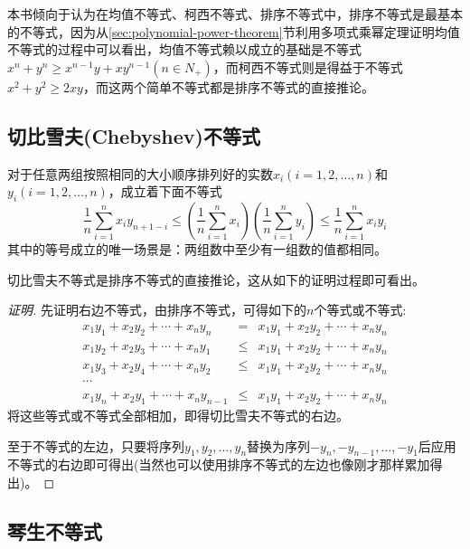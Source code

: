 本书倾向于认为在均值不等式、柯西不等式、排序不等式中，排序不等式是最基本的不等式，因为从\ref{sec:polynomial-power-theorem}节利用多项式乘幂定理证明均值不等式的过程中可以看出，均值不等式赖以成立的基础是不等式$x^n+y^n \geqslant x^{n-1}y+xy^{n-1}(n \in N_+)$，而柯西不等式则是得益于不等式$x^2+y^2 \geqslant 2xy$，而这两个简单不等式都是排序不等式的直接推论。

\subsection{切比雪夫(Chebyshev)不等式}

\begin{theorem}[切比雪夫不等式]
对于任意两组按照相同的大小顺序排列好的实数$x_i(i=1,2,\ldots,n)$和$y_i(i=1,2,\ldots,n)$，成立着下面不等式
\begin{equation}
  \label{eq:chebyshev-inequation}
  \frac{1}{n}\sum_{i=1}^nx_iy_{n+1-i}
  \leqslant \left( \frac{1}{n}\sum_{i=1}^nx_i \right) \left( \frac{1}{n}\sum_{i=1}^ny_i \right)
  \leqslant \frac{1}{n}\sum_{i=1}^nx_iy_i
\end{equation}
其中的等号成立的唯一场景是：两组数中至少有一组数的值都相同。
\end{theorem}

切比雪夫不等式是排序不等式的直接推论，这从如下的证明过程即可看出。

\begin{proof}[证明]
  先证明右边不等式，由排序不等式，可得如下的$n$个等式或不等式:
  \begin{eqnarray*}
    x_1y_1+x_2y_2+\cdots+x_ny_n &=& x_1y_1+x_2y_2+\cdots+x_ny_n \\
    x_1y_2+x_2y_3+\cdots+x_ny_1 & \leqslant & x_1y_1+x_2y_2+\cdots+x_ny_n \\
    x_1y_3+x_2y_4+\cdots+x_ny_2 & \leqslant & x_1y_1+x_2y_2+\cdots+x_ny_n \\
    \cdots & & \\
    x_1y_n+x_2y_1+\cdots+x_ny_{n-1} & \leqslant & x_1y_1+x_2y_2+\cdots+x_ny_n 
  \end{eqnarray*}
  将这些等式或不等式全部相加，即得切比雪夫不等式的右边。

  至于不等式的左边，只要将序列$y_1,y_2,\ldots,y_n$替换为序列$-y_n,-y_{n-1},\ldots,-y_1$后应用不等式的右边即可得出(当然也可以使用排序不等式的左边也像刚才那样累加得出)。
\end{proof}

\subsection{琴生不等式}
\label{sec:jenson-inequality}

